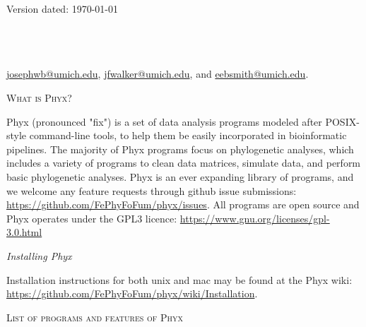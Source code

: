 \documentclass[12pt,letterpaper]{article}
\renewcommand{\section}[1]{%
\bigskip
\begin{center}
\begin{Large}
\normalfont\scshape #1
\medskip
\end{Large}
\end{center}}
\renewcommand{\subsection}[1]{%
\bigskip
\begin{center}
\begin{large}
\normalfont\itshape #1
\end{large}
\end{center}}
\begin{document}
\begin{flushright}
Version dated: \today
\end{flushright}
\bigskip

\\
\\
\\

\medskip
{} \href{josephwb@umich.edu}{josephwb@umich.edu}, \href{jfwalker@umich.edu}{jfwalker@umich.edu}, and \href{eebsmith@umich.edu}{eebsmith@umich.edu}.\\
\medskip

\vspace{1in}

\section{What is Phyx?}\label{abstract}
Phyx (pronounced "fix") is a set of data analysis programs modeled after POSIX-style command-line tools, to help them be easily incorporated in bioinformatic pipelines. The majority of Phyx programs focus on phylogenetic analyses, which includes a variety of programs to clean data matrices, simulate data, and perform basic phylogenetic analyses. Phyx is an ever expanding library of programs, and we welcome any feature requests through github issue submissions: \href{https://github.com/FePhyFoFum/phyx/issues}{https://github.com/FePhyFoFum/phyx/issues}. 
All programs are open source and Phyx operates under the GPL3 licence: \href{https://www.gnu.org/licenses/gpl-3.0.html}{https://www.gnu.org/licenses/gpl-3.0.html}

\subsection{Installing Phyx}\label{introduction}
\begin{flushleft}
Installation instructions for both unix and mac may be found at the Phyx wiki: \href{https://github.com/FePhyFoFum/phyx/wiki/Installation}{https://github.com/FePhyFoFum/phyx/wiki/Installation}.
\end{flushleft}

\section{List of programs and features of Phyx}
\end{document}
